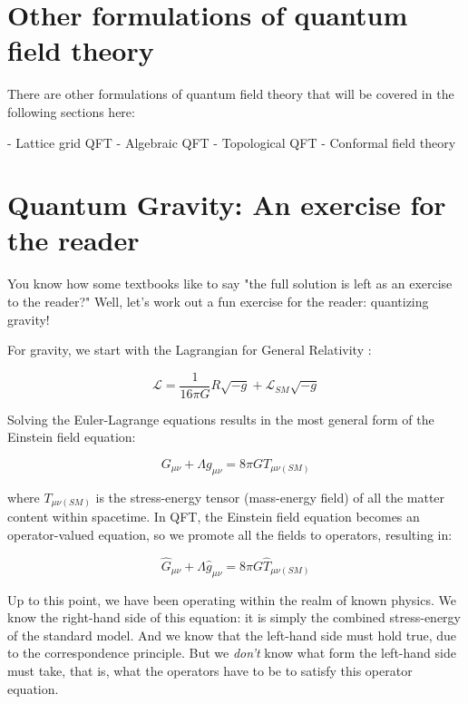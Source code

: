 \section{Other formulations of quantum field theory}

There are other formulations of quantum field theory that will be covered in the following sections here:

- Lattice grid QFT
- Algebraic QFT
- Topological QFT
- Conformal field theory

\section{Quantum Gravity: An exercise for the reader}

You know how some textbooks like to say "the full solution is left as an exercise to the reader?" Well, let's work out a fun exercise for the reader: quantizing gravity!

For gravity, we start with the Lagrangian for General Relativity :

\begin{equation}
\mathscr{L} = \frac{1}{16 \pi G} R \sqrt{-g} + \mathscr{L}_{SM} \sqrt{-g}
\end{equation}

Solving the Euler-Lagrange equations results in the most general form of the Einstein field equation:

\begin{equation}
G_{\mu \nu} + \Lambda g_{\mu \nu} = 8\pi G T_{\mu \nu (SM)}
\end{equation}

where $T_{\mu \nu (SM)}$ is the stress-energy tensor (mass-energy field) of all the matter content within spacetime. In QFT, the Einstein field equation becomes an operator-valued equation, so we promote all the fields to operators, resulting in:

\begin{equation}
\hat G_{\mu \nu} + \Lambda \hat g_{\mu \nu} = 8\pi G \hat T_{\mu \nu (SM)}
\end{equation}

Up to this point, we have been operating within the realm of known physics. We know the right-hand side of this equation: it is simply the combined stress-energy of the standard model. And we know that the left-hand side must hold true, due to the correspondence principle. But we \emph{don't} know what form the left-hand side must take, that is, what the operators have to be to satisfy this operator equation.

